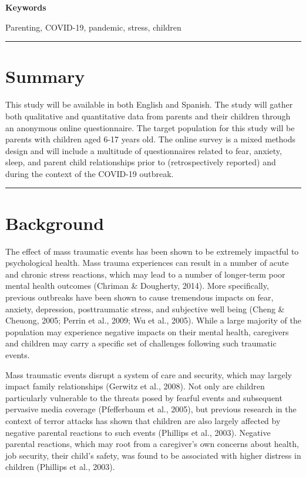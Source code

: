 \documentclass[]{book}
\begin{document}
\textbf{Keywords}

Parenting, COVID-19, pandemic, stress, children

\begin{center}\rule{0.5\linewidth}{0.5pt}\end{center}

\hypertarget{summary}{%
\section{Summary}\label{summary}}

This study will be available in both English and Spanish. The study will gather both qualitative and quantitative data from parents and their children through an anonymous online questionnaire. The target population for this study will be parents with children aged 6-17 years old. The online survey is a mixed methods design and will include a multitude of questionnaires related to fear, anxiety, sleep, and parent child relationships prior to (retrospectively reported) and during the context of the COVID-19 outbreak.

\begin{center}\rule{0.5\linewidth}{0.5pt}\end{center}

\hypertarget{background}{%
\section{Background}\label{background}}

The effect of mass traumatic events has been shown to be extremely impactful to psychological health. Mass trauma experiences can result in a number of acute and chronic stress reactions, which may lead to a number of longer-term poor mental health outcomes (Chriman \& Dougherty, 2014). More specifically, previous outbreaks have been shown to cause tremendous impacts on fear, anxiety, depression, posttraumatic stress, and subjective well being (Cheng \& Cheuong, 2005; Perrin et al., 2009; Wu et al., 2005). While a large majority of the population may experience negative impacts on their mental health, caregivers and children may carry a specific set of challenges following such traumatic events.

Mass traumatic events disrupt a system of care and security, which may largely impact family relationships (Gerwitz et al., 2008). Not only are children particularly vulnerable to the threats posed by fearful events and subsequent pervasive media coverage (Pfefferbaum et al., 2005), but previous research in the context of terror attacks has shown that children are also largely affected by negative parental reactions to such events (Phillips et al., 2003). Negative parental reactions, which may root from a caregiver's own concerns about health, job security, their child's safety, was found to be associated with higher distress in children (Phillips et al., 2003).
\end{document}
